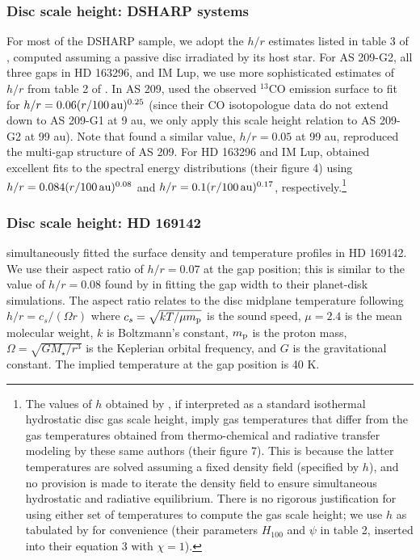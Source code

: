 \documentclass[fleqn,usenatbib]{mnras}
\begin{document}
\subsubsection{Disc scale height: DSHARP systems}
\label{subsubsec:hr_dsharp}
For most of the DSHARP sample, we adopt the $h/r$ estimates listed in table 3 of \cite{zhang_etal_2018}, computed assuming a passive disc irradiated by its host star. For AS 209-G2, all three gaps in HD 163296, and IM Lup, we use more sophisticated 
estimates of $h/r$ from table 2 of \citet[][]{zhang_etal_2021}. In AS 209, \cite{zhang_etal_2021}
used the observed $^{13}$CO emission surface to fit for $h/r = 0.06(r/100\,\rm au)^{0.25}$ (since their CO isotopologue data do not extend down to AS 209-G1 at 9 au, we only apply this scale height relation to AS 209-G2 at 99 au). Note that
\cite{zhang_etal_2018} found a similar value, $h/r = 0.05$ at 99 au, reproduced the multi-gap structure of AS 209. For HD 163296 and IM Lup, \cite{zhang_etal_2021} obtained excellent fits to the spectral energy distributions (their figure 4) using $h/r = 0.084(r/100\,\rm au)^{0.08}$ and $h/r = 0.1(r/100\,\rm au)^{0.17}$, respectively.\footnote{
The values of $h$ 
obtained by \cite{zhang_etal_2021},
if interpreted as a standard isothermal 
hydrostatic disc gas scale height,
imply gas temperatures that differ from
the gas temperatures obtained from thermo-chemical and radiative transfer modeling by these same authors (their figure 7). This is because the latter temperatures are solved assuming a fixed density field (specified by $h$), and no provision is made to iterate the density field to ensure simultaneous hydrostatic and radiative equilibrium. There is no rigorous justification for using either set of temperatures to compute the gas scale height; we use $h$ as tabulated
by \cite{zhang_etal_2021} for convenience (their parameters $H_{100}$ and $\psi$ in table 2, inserted into their equation 3 with $\chi = 1$).
}

\subsubsection{Disc scale height: HD 169142}
\cite{fedele_etal_2017} simultaneously fitted the surface density and temperature profiles 
in HD 169142. We use their 
aspect ratio of $h/r = 0.07$ at the gap position; this is
similar to the value of $h/r = 0.08$ found by \cite{dong_fung_2017} in fitting the gap width to their planet-disk simulations. The aspect ratio relates to the disc midplane temperature following $h/r = c_s/(\Omega r)$ where $c_s = \sqrt{kT/\mu m_{\rm p}}$ is the sound speed, $\mu = 2.4$ is the mean molecular weight, $k$ is Boltzmann's constant, $m_{\rm p}$ is the proton mass, $\Omega = \sqrt{GM_{\star}/r^3}$ is the Keplerian orbital frequency, and $G$ is the gravitational constant. The implied temperature at the gap position is 40 K.
\end{document}
